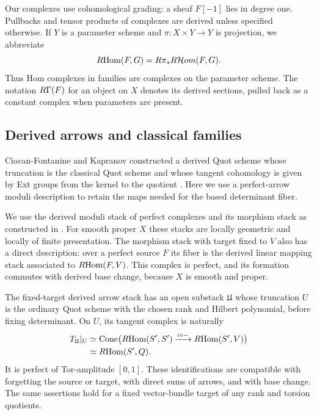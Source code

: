 Our complexes use cohomological grading: a sheaf $F[-1]$ lies in degree
one.  Pullbacks and tensor products of complexes are derived unless
specified otherwise.  If $Y$ is a parameter scheme and
$\pi:X\times Y\to Y$ is projection,
we abbreviate
\[
R\!\operatorname{Hom}(F,G)=R\pi_*R\mathcal{H}om(F,G).
\]
Thus Hom complexes in families are complexes on the parameter scheme.
The notation $R\Gamma(F)$ for an object on $X$ denotes its derived sections,
pulled back as a constant complex when parameters are present.

\subsection{Derived arrows and classical families}

Ciocan-Fontanine and Kapranov constructed a derived Quot scheme
whose truncation is the classical Quot scheme and whose tangent
cohomology is given by Ext groups from the kernel to the quotient
\cite[Theorem~4.3.2]{CFK}. Here we use a perfect-arrow moduli
description to retain the maps needed for the based determinant fiber.

We use the derived moduli stack of perfect complexes and its morphism
stack as constructed in \cite[Theorem~3.6, Definition~3.18, and Corollaries~3.17,
3.19, and~3.29]{TV}.  For smooth proper $X$ these stacks are locally
geometric and locally of finite presentation.  The morphism stack with
target fixed to $V$ also has a direct description: over a perfect source
$F$ its fiber is the derived linear mapping stack associated to
$R\!\operatorname{Hom}(F,V)$.  This complex is perfect, and its formation commutes with
derived base change, because $X$ is smooth and proper.

\begin{lemma}\label{der:arrow}
The fixed-target derived arrow stack has an open substack $\mathfrak U$
whose truncation $U$ is the ordinary Quot scheme with the chosen rank and
Hilbert polynomial, before fixing determinant.  On $U$, its tangent
complex is naturally
\begin{equation}\label{der:unrestricted-tangent}
\begin{aligned}
T_{\mathfrak U}|_U
&\simeq\operatorname{Cone}\bigl(R\!\operatorname{Hom}(S',S')\xrightarrow{i\circ-}R\!\operatorname{Hom}(S',V)\bigr)\\
&\simeq R\!\operatorname{Hom}(S',Q).
\end{aligned}
\end{equation}
It is perfect of Tor-amplitude $[0,1]$.  These identifications are
compatible with forgetting the source or target, with direct sums of
arrows, and with base change.  The same assertions hold for a fixed
vector-bundle target of any rank and torsion quotients.
\end{lemma}

